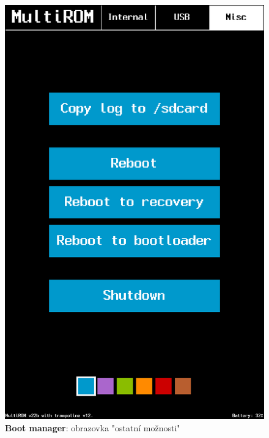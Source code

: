 \documentclass[12pt, a4paper, oneside]{article}
\newcommand{\B}{\textbf} %
\begin{document}
\begin{figure}[H]
\begin{center}
 \includegraphics[height=\textheight-20]{img/boot_manager_misc.png}
\caption{\B{Boot manager}: obrazovka "ostatní možnosti"}
\end{center}
\end{figure}
\end{document}
